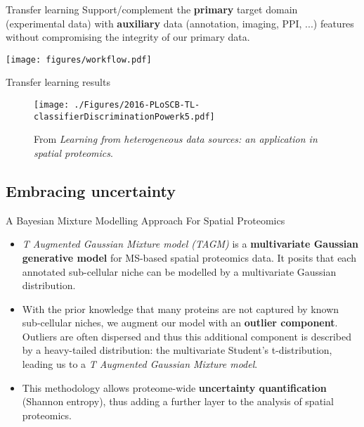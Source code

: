 \begin{frame}{}

  \begin{block}{Transfer learning}
    Support/complement the \textbf{primary} target domain
    (experimental data) with \textbf{auxiliary} data (annotation,
    imaging, PPI, ...)  features without compromising the integrity of
    our primary data.
  \end{block}

\end{frame}


\begin{frame}
  \begin{center}
    \texttt{[image: figures/workflow.pdf]}
  \end{center}
\end{frame}


\begin{frame}{Transfer learning results}

  \begin{figure}[h]
    \centering
    \texttt{[image: ./Figures/2016-PLoSCB-TL-classifierDiscriminationPowerk5.pdf]}
    \caption{{\footnotesize From \cite{Breckels:2016} \textit{Learning from
          heterogeneous data sources: an application in spatial
          proteomics}.}
    }
\label{fig:tlres}
  \end{figure}

\end{frame}

\subsection{Embracing uncertainty}

\begin{frame}{A Bayesian Mixture Modelling Approach For Spatial Proteomics}

  \begin{itemize}

    \item<+-> \textit{T Augmented Gaussian Mixture model (TAGM)} is a
      \textbf{multivariate Gaussian generative model} for MS-based
      spatial proteomics data. It posits that each annotated
      sub-cellular niche can be modelled by a multivariate Gaussian
      distribution.

    \item<+-> With the prior knowledge that many proteins are not
      captured by known sub-cellular niches, we augment our model with
      an \textbf{outlier component}. Outliers are often dispersed and
      thus this additional component is described by a heavy-tailed
      distribution: the multivariate Student's t-distribution, leading
      us to a \textit{T Augmented Gaussian Mixture model}.

    \item<+-> This methodology allows proteome-wide
      \textbf{uncertainty quantification} (Shannon entropy), thus
      adding a further layer to the analysis of spatial proteomics.

  \end{itemize}
\end{frame}

